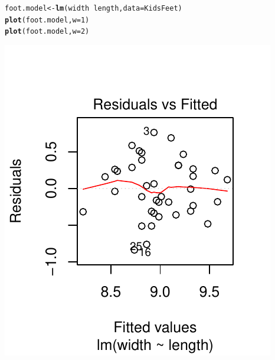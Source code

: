 \documentclass[twoside]{book}\usepackage[]{graphicx}\usepackage[]{xcolor}
\makeatletter
\def\maxwidth{ %
  \ifdim\Gin@nat@width>\linewidth
    \linewidth
  \else
    \Gin@nat@width
  \fi
}
\newcommand{\hlnum}[1]{\textcolor[rgb]{0.686,0.059,0.569}{#1}}%
\newcommand{\hlopt}[1]{\textcolor[rgb]{0,0,0}{#1}}%
\newcommand{\hlstd}[1]{\textcolor[rgb]{0.345,0.345,0.345}{#1}}%
\newcommand{\hlkwb}[1]{\textcolor[rgb]{0.69,0.353,0.396}{#1}}%
\newcommand{\hlkwc}[1]{\textcolor[rgb]{0.333,0.667,0.333}{#1}}%
\newcommand{\hlkwd}[1]{\textcolor[rgb]{0.737,0.353,0.396}{\textbf{#1}}}%
\newenvironment{kframe}{%
 \def\at@end@of@kframe{}%
 \ifinner\ifhmode%
  \def\at@end@of@kframe{\end{minipage}}%
  \begin{minipage}{\columnwidth}%
 \fi\fi%
 \def\FrameCommand##1{\hskip\@totalleftmargin \hskip-\fboxsep
 \colorbox{shadecolor}{##1}\hskip-\fboxsep
     \hskip-\linewidth \hskip-\@totalleftmargin \hskip\columnwidth}%
 \MakeFramed {\advance\hsize-\width
   \@totalleftmargin\z@ \linewidth\hsize
   \@setminipage}}%
 {\par\unskip\endMakeFramed%
 \at@end@of@kframe}
\newenvironment{knitrout}{}{} %
\makeatother
\begin{document}
\begin{solution}
\begin{knitrout}
\color{fgcolor}\begin{kframe}
\begin{alltt}
\hlstd{foot.model} \hlkwb{<-} \hlkwd{lm}\hlstd{( width} \hlopt{~} \hlstd{length,} \hlkwc{data}\hlstd{=KidsFeet)}
\hlkwd{plot}\hlstd{(foot.model,} \hlkwc{w}\hlstd{=}\hlnum{1}\hlstd{)}
\hlkwd{plot}\hlstd{(foot.model,} \hlkwc{w}\hlstd{=}\hlnum{2}\hlstd{)}
\end{alltt}
\end{kframe}

{\centering \includegraphics[width=\maxwidth]{figures/fig-unnamed-chunk-184-1} 
}
\end{knitrout}
\end{solution}
\end{document}
